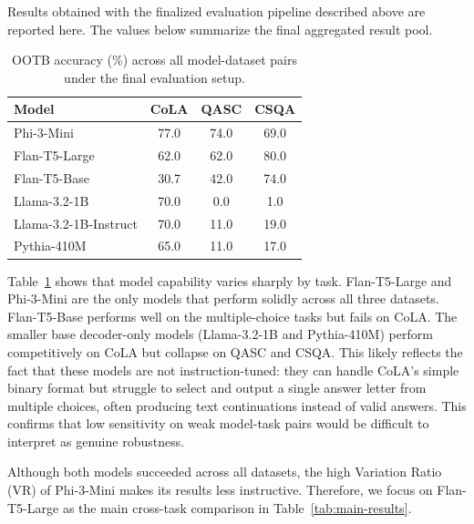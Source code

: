 \documentclass[11pt]{article}
\begin{document}
Results obtained with the finalized evaluation pipeline described above are reported here. The values below summarize the final aggregated result pool.

\begin{table}[t]
\centering
\small
\setlength{\tabcolsep}{4pt}
\begin{tabular}{lccc}
\toprule
Model & CoLA & QASC & CSQA \\
\midrule
Phi-3-Mini & 77.0 & 74.0 & 69.0 \\
Flan-T5-Large & 62.0 & 62.0 & 80.0 \\
Flan-T5-Base & 30.7 & 42.0 & 74.0 \\
Llama-3.2-1B & 70.0 & 0.0 & 1.0 \\
Llama-3.2-1B-Instruct & 70.0 & 11.0 & 19.0 \\
Pythia-410M & 65.0 & 11.0 & 17.0 \\
\bottomrule
\end{tabular}
\caption{OOTB accuracy (\%) across all model-dataset pairs under the final evaluation setup.}
\label{tab:ootb}
\end{table}

Table~\ref{tab:ootb} shows that model capability varies sharply by task. Flan-T5-Large and Phi-3-Mini are the only models that perform solidly across all three datasets. Flan-T5-Base performs well on the multiple-choice tasks but fails on CoLA. The smaller base decoder-only models (Llama-3.2-1B and Pythia-410M) perform competitively on CoLA but collapse on QASC and CSQA. This likely reflects the fact that these models are not instruction-tuned: they can handle CoLA's simple binary format but struggle to select and output a single answer letter from multiple choices, often producing text continuations instead of valid answers. This confirms that low sensitivity on weak model-task pairs would be difficult to interpret as genuine robustness.

Although both models succeeded across all datasets, the high Variation Ratio (VR) of Phi-3-Mini makes its results less instructive. Therefore, we focus on Flan-T5-Large as the main cross-task comparison in Table~\ref{tab:main-results}.
\end{document}
